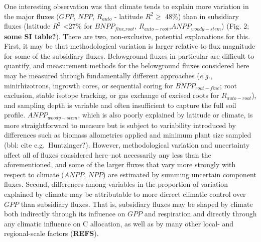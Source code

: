 \documentclass[]{article}
\begin{document}
One interesting observation was that climate tends to explain more
variation in the major fluxes (\(GPP\), \(NPP\), \(R_{auto}\) - latitude
\(R^2\ge\) 48\%) than in subsidiary fluxes (latitude \(R^2\)
\textless{}27\% for \(BNPP_{fine.root}\),
\(R_{auto-root}\),\(ANPP_{woody-stem}\)) (Fig. 2; \textbf{some SI
table?}). There are two, non-exclusive, potential explanations for this.
First, it may be that methodological variation is larger relative to
flux magnitude for some of the subsidiary fluxes. Belowground fluxes in
particular are difficult to quantify, and measurement methods for the
belowground fluxes considered here may be measured through fundamentally
different approaches (\emph{e.g.}, minirhizotrons, ingrowth cores, or
sequential coring for \(BNPP_{root-fine}\); root exclusion, stable
isotope tracking, or gas exchange of excised roots for
\(R_{auto-root}\)), and sampling depth is variable and often
insufficient to capture the full soil profile. \(ANPP_{woody-stem}\),
which is also poorly explained by latitude or climate, is more
straightforward to measure but is subject to variability introduced by
differences such as biomass allometries applied and minimum plant size
sampled (bbl: cite e.g.~Huntzinger?). However, methodological variation
and uncertainty affect all of fluxes considered here--not necessarily
any less than the aforementioned, and some of the larger fluxes that
vary more strongly with respect to climate (\(ANPP\), \(NPP\)) are
estimated by summing uncertain component fluxes. Second, differences
among variables in the proportion of variation explained by climate may
be attributable to more dicrect climatic control over \(GPP\) than
subsidiary fluxes. That is, subsidiary fluxes may be shaped by climate
both indirectly through its influence on \(GPP\) and respiration and
directly through any climatic influence on C allocation, as well as by
many other local- and regional-scale factors (\textbf{REFS}).
\end{document}
